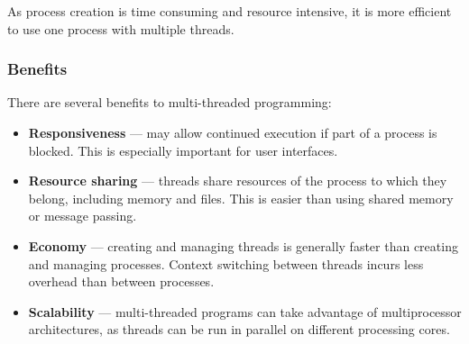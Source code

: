 \documentclass{article}
\begin{document}
As process creation is time consuming and resource intensive, it is
more efficient to use one process with multiple threads.
\subsubsection{Benefits}
There are several benefits to multi-threaded programming:
\begin{itemize}
    \item \textbf{Responsiveness} --- may allow continued execution if
          part of a process is blocked. This is especially important
          for user interfaces.
    \item \textbf{Resource sharing} --- threads share resources of the
          process to which they belong, including memory and files.
          This is easier than using shared memory or message passing.
    \item \textbf{Economy} --- creating and managing threads is
          generally faster than creating and managing processes. Context
          switching between threads incurs less overhead than between
          processes.
    \item \textbf{Scalability} --- multi-threaded programs can take
          advantage of multiprocessor architectures, as threads can be
          run in parallel on different processing cores.
\end{itemize}
\end{document}
